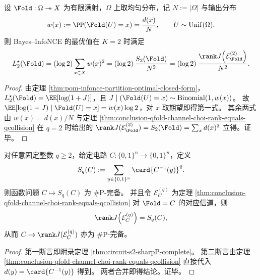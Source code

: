 \begin{corollary}[Bayes--InfoNCE 在 \texorpdfstring{$K=2$}{K=2} 时等价于二次碰撞矩与 Choi 秩]\label{cor:conclusion-bayes-infonce2-equals-qcollision2-choi-rank}
设 \(\Fold:\Omega\twoheadrightarrow X\) 为有限满射，\(\Omega\) 上取均匀分布，记 \(N:=|\Omega|\) 与输出分布
\[
w(x):=\PP(\Fold(U)=x)=\frac{d(x)}{N},\qquad U\sim\mathrm{Unif}(\Omega).
\]
则 Bayes--InfoNCE 的最优值在 \(K=2\) 时满足
\[
L_2^\star(\Fold)
=(\log 2)\sum_{x\in X}w(x)^2
=(\log 2)\,\frac{S_2(\Fold)}{N^2}
=(\log 2)\,\frac{\rank J\!\left(\mathcal E_{\Fold}^{(2)}\right)}{N^2}.
\]
\end{corollary}
\begin{proof}
由定理 \ref{thm:pom-infonce-partition-optimal-closed-form}，\(L_2^\star(\Fold)=\EE[\log(1+J)]\)，且
\(
J\mid(\Fold(U)=x)\sim\mathrm{Binomial}(1,w(x))
\)。
故
\(
\EE[\log(1+J)\mid \Fold(U)=x]=w(x)\log 2
\)，对 \(x\) 取期望即得第一式。
其余两式由 \(w(x)=d(x)/N\) 与定理 \ref{thm:conclusion-qfold-channel-choi-rank-equals-qcollision} 在 \(q=2\) 时给出的
\(
\rank J(\mathcal E_{\Fold}^{(2)})=S_2(\Fold)=\sum_x d(x)^2
\)
立得。证毕。
\end{proof}

\begin{theorem}[固定阶 \texorpdfstring{$q\ge 2$}{q>=2} 时碰撞矩与对应 Choi 秩计算的 \texorpdfstring{\(\#\mathrm{P}\)}{\#P} 完备性]\label{thm:conclusion-fixed-q-collision-choi-rank-sharpp-complete}
对任意固定整数 \(q\ge 2\)，给定电路 \(C:\{0,1\}^n\to\{0,1\}^n\)，定义
\[
S_q(C):=\sum_{y\in\{0,1\}^n}\card{C^{-1}(y)}^q.
\]
则函数问题 \(C\mapsto S_q(C)\) 为 \(\#\mathrm P\)-完备。
并且令 \(\mathcal E_C^{(q)}\) 为定理 \ref{thm:conclusion-qfold-channel-choi-rank-equals-qcollision} 对 \(\Fold=C\) 的对应信道，则
\[
\rank J\!\left(\mathcal E_C^{(q)}\right)=S_q(C),
\]
从而 \(C\mapsto \rank J(\mathcal E_C^{(q)})\) 亦为 \(\#\mathrm P\)-完备。
\end{theorem}
\begin{proof}
第一断言即附录定理 \ref{thm:circuit-s2-sharpP-complete}。
第二断言由定理 \ref{thm:conclusion-qfold-channel-choi-rank-equals-qcollision} 直接代入 \(d(y)=\card{C^{-1}(y)}\) 得到。
两者合并即得结论。证毕。
\end{proof}

